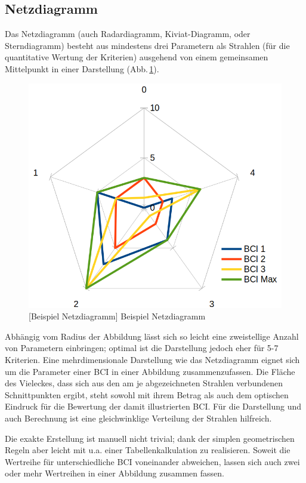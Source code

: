\subsection{Netzdiagramm}\label{}

Das Netzdiagramm (auch Radardiagramm, Kiviat-Diagramm, oder Sterndiagramm) besteht aus mindestens drei Parametern als Strahlen (für die quantitative Wertung der Kriterien) ausgehend von einem gemeinsamen Mittelpunkt in einer Darstellung (Abb.\,\ref{disp:web:pic}).

\begin{figure}[!htp]
\centering
\includegraphics[width=.6\textwidth]{img/disp-web}
[Beispiel Netzdiagramm]{\label{disp:web:pic} Beispiel Netzdiagramm}
\end{figure}

Abhängig vom Radius der Abbildung lässt sich so leicht eine zweistellige Anzahl von Parametern einbringen;
optimal ist die Darstellung jedoch eher für 5-7 Kriterien.
Eine mehrdimensionale Darstellung wie das Netzdiagramm eignet sich um die Parameter einer \gls{BCI} in einer Abbildung zusammenzufassen.
Die Fläche des Vieleckes, dass sich aus den am je abgezeichneten Strahlen verbundenen Schnittpunkten ergibt, steht sowohl mit ihrem Betrag als auch dem optischen Eindruck für die Bewertung der damit illustrierten \gls{BCI}.
Für die Darstellung und auch Berechnung ist eine gleichwinklige Verteilung der Strahlen hilfreich.

Die exakte Erstellung ist manuell nicht trivial; dank der simplen geometrischen Regeln aber leicht mit u.a. einer Tabellenkalkulation zu realisieren.
Soweit die Wertreihe für unterschiedliche \gls{BCI} voneinander abweichen, lassen sich auch zwei oder mehr Wertreihen in einer Abbildung zusammen fassen.

